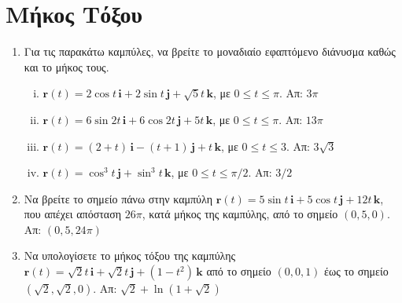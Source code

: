 




\geometry{left=1.5cm,right=1.5cm}



\begin{center}
  \minibox{\bfseries\large \textcolor{Col1}{Ασκήσεις στις Καμπύλες}} 
\end{center} 

\vspace{\baselineskip} 


\section*{Μήκος Τόξου}

\begin{enumerate}
  \item Για τις παρακάτω καμπύλες, να βρείτε το μοναδιαίο εφαπτόμενο διάνυσμα 
    καθώς και το μήκος τους.
    \begin{enumerate}[i)]
      \item $ \mathbf{r}(t)=2 \cos{t}\, \mathbf{i} + 2 \sin{t}\, \mathbf{j} +
        \sqrt{5} t \, \mathbf{k}$, \; με $ 0 \leq t \leq \pi $. \hfill Απ: $ 3 \pi $  
      \item $ \mathbf{r}(t)=6 \sin{2t}\, \mathbf{i} + 6 \cos{2t}\, \mathbf{j} + 5t \, 
        \mathbf{k} $, \; με $ 0 \leq t \leq \pi $. \hfill Απ: $ 13 \pi $  
      \item $ \mathbf{r}(t)=(2+t)\, \mathbf{i} - (t+1) \, \mathbf{j} + t \, \mathbf{k} $,
       \; με $ 0 \leq t \leq 3 $. \hfill Απ: $ 3 \sqrt{3} $ 
      \item $ \mathbf{r}(t)= \cos^{3}{t}\, \mathbf{j} + \sin^{3}{t}\, \mathbf{k} $, 
        \; με $ 0 \leq t \leq \pi /2 $. \hfill Απ: $ 3/2 $ 
    \end{enumerate}

  \item Να βρείτε το σημείο πάνω στην καμπύλη $ \mathbf{r}(t)=5 \sin{t}\, \mathbf{i} + 5
    \cos{t}\, \mathbf{j} + 12t \, \mathbf{k} $, που απέχει απόσταση $ 26 \pi $, κατά 
    μήκος της καμπύλης, από το σημείο $ (0,5,0) $. \hfill Απ: $ (0,5,24 \pi) $  

  \item Να υπολογίσετε το μήκος τόξου της καμπύλης $ \mathbf{r}(t)= \sqrt{2} t\, 
    \mathbf{i} + \sqrt{2} t \, \mathbf{j} + (1-t^{2}) \, \mathbf{k} $ από το σημείο 
    $ (0,0,1) $ έως το σημείο $ (\sqrt{2} , \sqrt{2} , 0) $. 
    \hfill Απ:  $ \sqrt{2} + \ln{(1+ \sqrt{2})} $


\end{enumerate}




